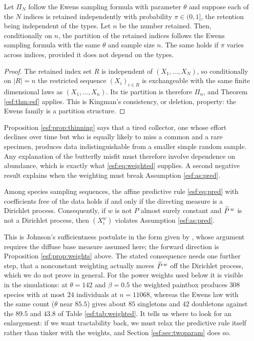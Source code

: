 \begin{proposition}
\label{esf:prop:thinning}
Let $\Pi_N$ follow the Ewens sampling formula with parameter $\theta$ and suppose each
of the $N$ indices is retained independently with probability $\pi \in (0,1]$, the
retention being independent of the types. Let $n$ be the number retained. Then,
conditionally on $n$, the partition of the retained indices follows the Ewens sampling
formula with the same $\theta$ and sample size $n$. The same holds if $\pi$ varies
across indices, provided it does not depend on the types.
\end{proposition}

\begin{proof}
The retained index set $R$ is independent of $(X_1,\dots,X_N)$, so conditionally on
$|R| = n$ the restricted sequence $(X_i)_{i \in R}$ is exchangeable with the same
finite dimensional laws as $(X_1,\dots,X_n)$. Its tie partition is therefore $\Pi_n$,
and Theorem \ref{esf:thm:esf} applies. This is Kingman's consistency, or deletion,
property: the Ewens family is a partition structure.
\end{proof}

Proposition \ref{esf:prop:thinning} says that a tired collector, one whose effort declines
over time but who is equally likely to miss a common and a rare specimen, produces
data indistinguishable from a smaller simple random sample. Any explanation of the
butterfly misfit must therefore involve dependence on abundance, which is exactly what
\eqref{esf:eq:weighted} supplies. A second negative result explains when the weighting must
break Assumption \ref{esf:as:pred}.

\begin{proposition}
\label{esf:prop:zabell}
Among species sampling sequences, the affine predictive rule \eqref{esf:eq:pred} with
coefficients free of the data holds if and only if the directing measure is a
Dirichlet process. Consequently, if $w$ is not $P$ almost surely constant and $\widetilde{P}^{\, w}$ is not a Dirichlet process, then
$(X_i^w)$ violates Assumption \ref{esf:as:pred}.
\end{proposition}

This is Johnson's sufficientness postulate in the form given by \citet{esf:zabell1982}, whose
argument requires the diffuse base measure assumed here; the forward direction is
Proposition \ref{esf:prop:weights} above. The stated consequence needs one further step,
that a nonconstant weighting actually moves $\widetilde{P}^{\, w}$ off the Dirichlet process,
which we do not prove in general. For the power weights used below it is visible in
the simulations: at $\theta = 142$ and $\beta = 0.5$ the weighted paintbox produces
$308$ species with at most $24$ individuals at $n = 11068$, whereas the Ewens law with the same count ($\theta$ near $85.5$) gives about $85$ singletons and $42$ doubletons against the $89.5$ and $43.8$ of Table \ref{esf:tab:weighted}. It tells us where to look
for an enlargement: if we want tractability back, we must relax the predictive rule
itself rather than tinker with the weights, and Section \ref{esf:sec:twoparam} does so.

